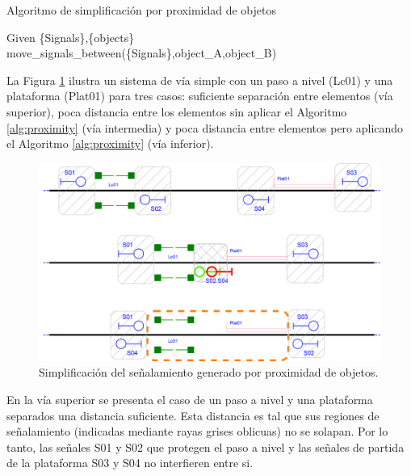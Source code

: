     \begin{algorithm}[hbt!]
        \caption{Algoritmo de simplificación por proximidad de objetos}
        \label{alg:proximity}
        \DontPrintSemicolon
        \SetNoFillComment
        \LinesNotNumbered 
            Given \{Signals\},\{objects\}\\
            {
                {
                    {
                        {
                            move\_signals\_between(\{Signals\},object\_A,object\_B)
                        }
                    }
                }
            }
    \end{algorithm}
    
    La Figura \ref{fig:signal_proximity} ilustra un sistema de vía simple con un paso a nivel (Lc01) y una plataforma (Plat01) para tres casos: suficiente separación entre elementos (vía superior), poca distancia entre los elementos sin aplicar el Algoritmo \ref{alg:proximity} (vía intermedia) y poca distancia entre elementos pero aplicando el Algoritmo \ref{alg:proximity} (vía inferior).
    
    \begin{figure}[h!]
        \centering
        \includegraphics[width=1\textwidth]{Figuras/proximity.PNG}
        \centering\caption{Simplificación del señalamiento generado por proximidad de objetos.}
        \label{fig:signal_proximity}
    \end{figure}

    En la vía superior se presenta el caso de un paso a nivel y una plataforma separados una distancia suficiente. Esta distancia es tal que sus regiones de señalamiento (indicadas mediante rayas grises oblicuas) no se solapan. Por lo tanto, las señales S01 y S02 que protegen el paso a nivel y las señales de partida de la plataforma S03 y S04 no interfieren entre si.

